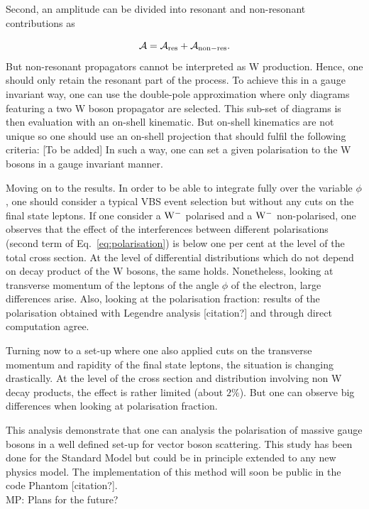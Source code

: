 Second, an amplitude can be divided into resonant and non-resonant contributions as

\begin{equation}
\mathcal{A} = \mathcal{A}_{\rm res} + \mathcal{A}_{\rm non-res} .
\end{equation}
%
But non-resonant propagators cannot be interpreted as W production.
Hence, one should only retain the resonant part of the process.
To achieve this in a gauge invariant way, one can use the double-pole approximation where only diagrams featuring a two W boson propagator are selected.
This sub-set of diagrams is then evaluation with an on-shell kinematic.
But on-shell kinematics are not unique so one should use an on-shell projection that should fulfil the following criteria:
[To be added]
In such a way, one can set a given polarisation to the W bosons in a gauge invariant manner.

Moving on to the results.
In order to be able to integrate fully over the variable $\phi$, one should consider a typical VBS event selection but without any cuts on the final state leptons.
If one consider a ${\rm W^-}$ polarised and a ${\rm W^-}$ non-polarised, one observes that the effect of the interferences between different polarisations (second term of Eq.~\eqref{eq:polarisation}) is below one per cent at the level of the total cross section.
At the level of differential distributions which do not depend on decay product of the W bosons, the same holds.
Nonetheless, looking at transverse momentum of the leptons of the angle $\phi$ of the electron, large differences arise.
Also, looking at the polarisation fraction: results of the polarisation obtained with Legendre analysis [citation?] and through direct computation agree.

Turning now to a set-up where one also applied cuts on the transverse momentum and rapidity of the final state leptons, the situation is changing drastically.
At the level of the cross section and distribution involving non W decay products, the effect is rather limited (about $2\%$).
But one can observe big differences when looking at polarisation fraction.

This analysis demonstrate that one can analysis the polarisation of massive gauge bosons in a well defined set-up for vector boson scattering.
This study has been done for the Standard Model but could be in principle extended to any new physics model.
The implementation of this method will soon be public in the code Phantom [citation?]. \\
MP: Plans for the future?

